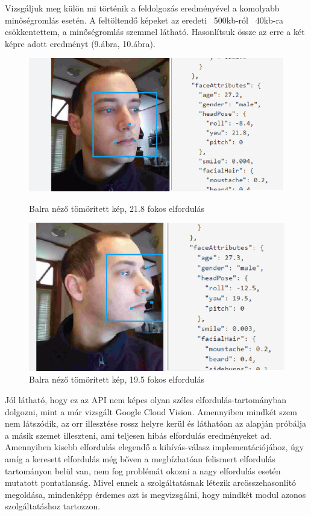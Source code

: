 Vizsgáljuk meg külön mi történik a feldolgozás eredményével a komolyabb minőségromlás esetén. A feltöltendő képeket az eredeti ~500kb-ról ~40kb-ra csökkentettem, a minőségromlás szemmel látható. Hasonlítsuk össze az erre a két képre adott eredményt (9.ábra, 10.ábra).
\begin{figure}[h]
 \begin{minipage}{.5\textwidth} 
\centering
    \includegraphics[scale=0.3]{img/mpo_left_compressed}
    \caption{Balra néző tömörített kép, 21.8 fokos elfordulás}
 \end{minipage}
 \begin{minipage}{.5\textwidth} 
\centering
     \includegraphics[scale=0.3]{img/mpo_very_left_compressed}
     \caption{Balra néző tömörített kép, 19.5 fokos elfordulás}
 \end{minipage}
\end{figure}

Jól látható, hogy ez az API nem képes olyan széles elfordulás-tartományban dolgozni, mint a már vizsgált Google Cloud Vision. Amennyiben mindkét szem nem látszódik, az orr illesztése rossz helyre kerül és láthatóan az alapján próbálja a másik szemet illeszteni, ami teljesen hibás elfordulás eredményeket ad. Amennyiben kisebb elfordulás elegendő a kihívás-válasz implementációjához, úgy amíg a keresett elfordulás még bőven a megbízhatóan felismert elfordulás tartományon belül van, nem fog problémát okozni a nagy elfordulás esetén mutatott pontatlanság. Mivel ennek a szolgáltatásnak létezik arcösszehasonlító megoldása, mindenképp érdemes azt is megvizsgálni, hogy mindkét modul azonos szolgáltatáshoz tartozzon.


